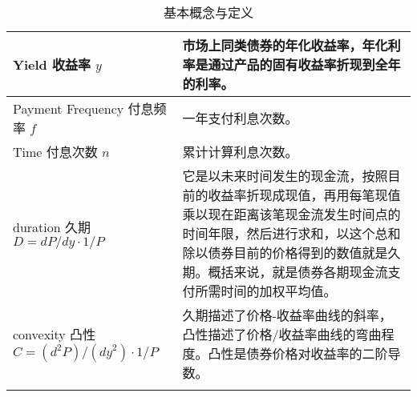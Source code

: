 \begin{longtable}{lX}
    Yield 收益率 $y$ & 市场上同类债券的年化收益率，年化利率是通过产品的固有收益率折现到全年的利率。\\ \hline
    Payment Frequency 付息频率  $f$ & 一年支付利息次数。\\ \hline
    Time 付息次数  $n$& 累计计算利息次数。\\ \hline

    duration 久期 $D={dP/dy} \cdot {1/P}$ & 它是以未来时间发生的现金流，按照目前的收益率折现成现值，再用每笔现值乘以现在距离该笔现金流发生时间点的时间年限，然后进行求和，以这个总和除以债券目前的价格得到的数值就是久期。概括来说，就是债券各期现金流支付所需时间的加权平均值。\\ \hline
    convexity 凸性 $C={(d^2{P})/({dy}^2 )} \cdot {1/P}$& 久期描述了价格-收益率曲线的斜率，凸性描述了价格/收益率曲线的弯曲程度。凸性是债券价格对收益率的二阶导数。\\ \hline

  \caption{基本概念与定义}
  \label{tab:sys.param}
  \end{longtable}

